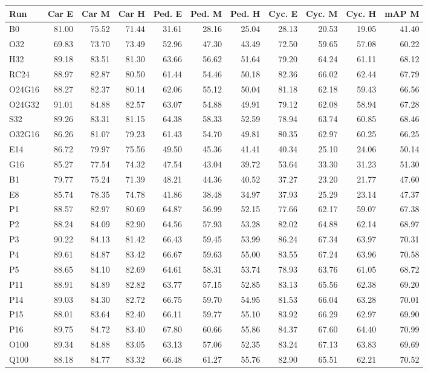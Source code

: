 \begin{tabular}{lrrrrrrrrrr}
\toprule
Run & Car E & Car M & Car H & Ped. E & Ped. M & Ped. H & Cyc. E & Cyc. M & Cyc. H & mAP M \\
\midrule
B0 & 81.00 & 75.52 & 71.44 & 31.61 & 28.16 & 25.04 & 28.13 & 20.53 & 19.05 & 41.40 \\
O32 & 69.83 & 73.70 & 73.49 & 52.96 & 47.30 & 43.49 & 72.50 & 59.65 & 57.08 & 60.22 \\
H32 & 89.18 & 83.51 & 81.30 & 63.66 & 56.62 & 51.64 & 79.20 & 64.24 & 61.11 & 68.12 \\
RC24 & 88.97 & 82.87 & 80.50 & 61.44 & 54.46 & 50.18 & 82.36 & 66.02 & 62.44 & 67.79 \\
O24G16 & 88.27 & 82.37 & 80.14 & 62.06 & 55.12 & 50.04 & 81.18 & 62.18 & 59.43 & 66.56 \\
O24G32 & 91.01 & 84.88 & 82.57 & 63.07 & 54.88 & 49.91 & 79.12 & 62.08 & 58.94 & 67.28 \\
S32 & 89.26 & 83.31 & 81.15 & 64.38 & 58.33 & 52.59 & 78.94 & 63.74 & 60.85 & 68.46 \\
O32G16 & 86.26 & 81.07 & 79.23 & 61.43 & 54.70 & 49.81 & 80.35 & 62.97 & 60.25 & 66.25 \\
E14 & 86.72 & 79.97 & 75.56 & 49.50 & 45.36 & 41.41 & 40.34 & 25.10 & 24.06 & 50.14 \\
G16 & 85.27 & 77.54 & 74.32 & 47.54 & 43.04 & 39.72 & 53.64 & 33.30 & 31.23 & 51.30 \\
B1 & 79.77 & 75.24 & 71.39 & 48.21 & 44.36 & 40.52 & 37.27 & 23.20 & 21.77 & 47.60 \\
E8 & 85.74 & 78.35 & 74.78 & 41.86 & 38.48 & 34.97 & 37.93 & 25.29 & 23.14 & 47.37 \\
P1 & 88.57 & 82.97 & 80.69 & 64.87 & 56.99 & 52.15 & 77.66 & 62.17 & 59.07 & 67.38 \\
P2 & 88.24 & 84.09 & 82.90 & 64.56 & 57.93 & 53.28 & 82.02 & 64.88 & 62.14 & 68.97 \\
P3 & 90.22 & 84.13 & 81.42 & 66.43 & 59.45 & 53.99 & 86.24 & 67.34 & 63.97 & 70.31 \\
P4 & 89.61 & 84.87 & 83.42 & 66.67 & 59.63 & 55.00 & 83.55 & 67.24 & 63.96 & 70.58 \\
P5 & 88.65 & 84.10 & 82.69 & 64.61 & 58.31 & 53.74 & 78.93 & 63.76 & 61.05 & 68.72 \\
P11 & 88.91 & 84.89 & 82.82 & 63.77 & 57.15 & 52.85 & 83.13 & 65.56 & 62.38 & 69.20 \\
P14 & 89.03 & 84.30 & 82.72 & 66.75 & 59.70 & 54.95 & 81.53 & 66.04 & 63.28 & 70.01 \\
P15 & 88.01 & 83.64 & 82.40 & 66.11 & 59.77 & 55.10 & 83.92 & 66.29 & 62.97 & 69.90 \\
P16 & 89.75 & 84.72 & 83.40 & 67.80 & 60.66 & 55.86 & 84.37 & 67.60 & 64.40 & 70.99 \\
O100 & 89.34 & 84.88 & 83.05 & 63.13 & 57.06 & 52.35 & 83.24 & 67.13 & 63.83 & 69.69 \\
Q100 & 88.18 & 84.77 & 83.32 & 66.48 & 61.27 & 55.76 & 82.90 & 65.51 & 62.21 & 70.52 \\
\bottomrule
\end{tabular}
